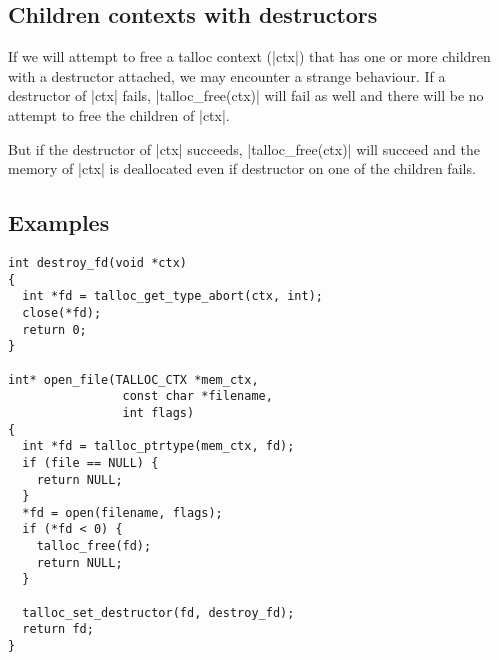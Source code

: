 \subsection{Children contexts with destructors}

If we will attempt to free a talloc context (|ctx|) that has one or more
children with a destructor attached, we may encounter a strange behaviour. If a
destructor of |ctx| fails, |talloc_free(ctx)| will fail as well and there will
be no attempt to free the children of |ctx|.

But if the destructor of |ctx| succeeds, |talloc_free(ctx)| will succeed and
the memory of |ctx| is deallocated even if destructor on one of the children
fails.

\subsection{Examples}

\begin{lstlisting}[caption={Close a file}]
int destroy_fd(void *ctx)
{
  int *fd = talloc_get_type_abort(ctx, int);
  close(*fd);
  return 0;
}

int* open_file(TALLOC_CTX *mem_ctx,
                const char *filename,
                int flags)
{
  int *fd = talloc_ptrtype(mem_ctx, fd);
  if (file == NULL) {
    return NULL;
  }
  *fd = open(filename, flags);
  if (*fd < 0) {
    talloc_free(fd);
    return NULL;
  }
  
  talloc_set_destructor(fd, destroy_fd);
  return fd;
}
\end{lstlisting}